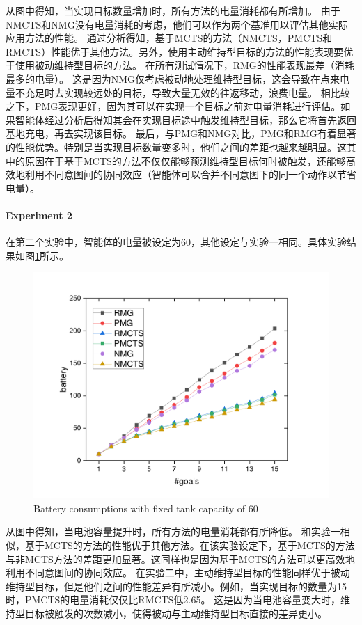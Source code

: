 从图中得知，当实现目标数量增加时，所有方法的电量消耗都有所增加。
由于NMCTS和NMG没有电量消耗的考虑，他们可以作为两个基准用以评估其他实际应用方法的性能。
通过分析得知，基于MCTS的方法（NMCTS，PMCTS和RMCTS）性能优于其他方法。另外，使用主动维持型目标的方法的性能表现要优于使用被动维持型目标的方法。
在所有测试情况下，RMG的性能表现最差（消耗最多的电量）。
这是因为NMG仅考虑被动地处理维持型目标，这会导致在点来电量不充足时去实现较远处的目标，导致大量无效的往返移动，浪费电量。
相比较之下，PMG表现更好，因为其可以在实现一个目标之前对电量消耗进行评估。如果智能体经过分析后得知其会在实现目标途中触发维持型目标，那么它将首先返回基地充电，再去实现该目标。
最后，与PMG和NMG对比，PMG和RMG有着显著的性能优势。特别是当实现目标数量变多时，他们之间的差距也越来越明显。这其中的原因在于基于MCTS的方法不仅仅能够预测维持型目标何时被触发，还能够高效地利用不同意图间的协同效应（智能体可以合并不同意图下的同一个动作以节省电量）。


\paragraph{Experiment 2}
在第二个实验中，智能体的电量被设定为60，其他设定与实验一相同。具体实验结果如图\ref{fig:static2}所示。
\begin{figure}[h!]
\centering
\includegraphics[scale=0.4]{./figs/gX_cY_fixCap60.pdf}
\captionsetup{justification=centering}
\caption{Battery consumptions with fixed tank capacity of 60}
\label{fig:static2}
\end{figure}

从图中得知，当电池容量提升时，所有方法的电量消耗都有所降低。
%
和实验一相似，基于MCTS的方法的性能优于其他方法。在该实验设定下，基于MCTS的方法与非MCTS方法的差距更加显著。这同样也是因为基于MCTS的方法可以更高效地利用不同意图间的协同效应。
%
在实验二中，主动维持型目标的性能同样优于被动维持型目标，但是他们之间的性能差异有所减小。例如，当实现目标的数量为15时，PMCTS的电量消耗仅仅比RMCTS低2.65。
%
这是因为当电池容量变大时，维持型目标被触发的次数减小，使得被动与主动维持型目标直接的差异更小。

